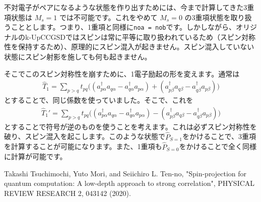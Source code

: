 \documentclass[prb,amsmath,amsfonts,amssymb]{revtex4}
\begin{document}
不対電子がペアになるような状態を作り出すためには、今まで計算してきた3重項状態は $M_s = 1$ では不可能です。これをやめて $M_s = 0$ の3重項状態を取り扱うこととします。つまり、1重項と同様に{\tt noa = nob}です。しかしながら、オリジナルのk-UpCCGSDではスピンは常に平等に取り扱われているため（スピン対称性を保持するため）、原理的にスピン混入が起きません。スピン混入していない状態にスピン射影を施しても何も起きません。

そこでこのスピン対称性を崩すために、1電子励起の形を変えます。通常は
\begin{align}
	\hat T_1 = \sum_{p>q} t_{pq} \Big((a_{p\alpha}^\dag a_{q\alpha} -  a_{q\alpha}^\dag a_{p\alpha}) + (a_{p\beta}^\dag a_{q\beta} -  a_{q\beta}^\dag a_{p\beta})\Big)
\end{align}
とすることで、同じ係数を使っていました。そこで、これを
\begin{align}
	\hat T_1' = \sum_{p>q} t_{pq} \Big((a_{p\alpha}^\dag a_{q\alpha} -  a_{q\alpha}^\dag a_{p\alpha}) - (a_{p\beta}^\dag a_{q\beta} -  a_{q\beta}^\dag a_{p\beta})\Big)
\end{align}
とすることで符号が逆のものを使うことを考えます。これは必ずスピン対称性を破り、スピン混入を起こします。このような状態で$\hat P_{S=1}$をかけることで、3重項を計算することが可能になります。また、1重項も$\hat P_{S=0}$をかけることで全く同様に計算が可能です。

\begin{thebibliography}{99}
   Takashi Tsuchimochi, Yuto Mori, and Seiichiro L. Ten-no, "Spin-projection for quantum computation: A low-depth approach to strong correlation", PHYSICAL REVIEW RESEARCH 2, 043142 (2020).
\end{thebibliography}
\end{document}
